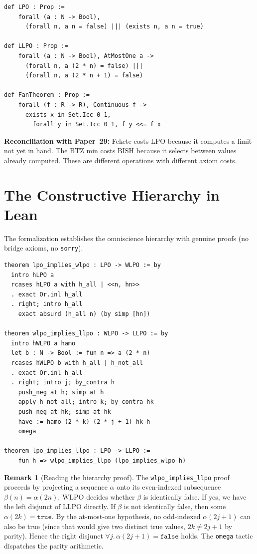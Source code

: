 \documentclass[11pt,a4paper]{article}
\theoremstyle{plain}
\theoremstyle{definition}
\newtheorem{remark}[theorem]{Remark}
\newcommand{\LPO}{\ensuremath{\mathrm{LPO}}}
\newcommand{\LLPO}{\ensuremath{\mathrm{LLPO}}}
\newcommand{\WLPO}{\ensuremath{\mathrm{WLPO}}}
\newcommand{\BISH}{\ensuremath{\mathrm{BISH}}}
\begin{document}
\begin{lstlisting}[caption={Omniscience principle definitions: \texttt{Defs.lean}}]
def LPO : Prop :=
    forall (a : N -> Bool),
      (forall n, a n = false) ||| (exists n, a n = true)

def LLPO : Prop :=
    forall (a : N -> Bool), AtMostOne a ->
      (forall n, a (2 * n) = false) |||
      (forall n, a (2 * n + 1) = false)

def FanTheorem : Prop :=
    forall (f : R -> R), Continuous f ->
      exists x in Set.Icc 0 1,
        forall y in Set.Icc 0 1, f y <<= f x
\end{lstlisting}

\textbf{Reconciliation with Paper~29:}
Fekete costs $\LPO$ because it computes a limit not yet in hand.
The BTZ min costs $\BISH$ because it selects between values
already computed.  These are different operations with
different axiom costs.

\section{The Constructive Hierarchy in Lean}\label{sec:hierarchy}

The formalization establishes the omniscience hierarchy with
genuine proofs (no bridge axioms, no \texttt{sorry}).

\begin{lstlisting}[caption={Hierarchy proofs: \texttt{Defs.lean}}]
theorem lpo_implies_wlpo : LPO -> WLPO := by
  intro hLPO a
  rcases hLPO a with h_all | <<n, hn>>
  . exact Or.inl h_all
  . right; intro h_all
    exact absurd (h_all n) (by simp [hn])

theorem wlpo_implies_llpo : WLPO -> LLPO := by
  intro hWLPO a hamo
  let b : N -> Bool := fun n => a (2 * n)
  rcases hWLPO b with h_all | h_not_all
  . exact Or.inl h_all
  . right; intro j; by_contra h
    push_neg at h; simp at h
    apply h_not_all; intro k; by_contra hk
    push_neg at hk; simp at hk
    have := hamo (2 * k) (2 * j + 1) hk h
    omega

theorem lpo_implies_llpo : LPO -> LLPO :=
    fun h => wlpo_implies_llpo (lpo_implies_wlpo h)
\end{lstlisting}

\begin{remark}[Reading the hierarchy proof]
The \texttt{wlpo\_implies\_llpo} proof proceeds by
projecting a sequence $\alpha$ onto its even-indexed subsequence
$\beta(n) = \alpha(2n)$.  $\WLPO$ decides whether $\beta$ is
identically false.  If yes, we have the left disjunct of $\LLPO$
directly.  If $\beta$ is not identically false, then some
$\alpha(2k) = \mathtt{true}$.  By the at-most-one hypothesis,
no odd-indexed $\alpha(2j+1)$ can also be true (since that would
give two distinct true values, $2k \neq 2j+1$ by parity).
Hence the right disjunct $\forall j.\, \alpha(2j+1) = \mathtt{false}$
holds.  The \texttt{omega} tactic dispatches the parity arithmetic.
\end{remark}
\end{document}
